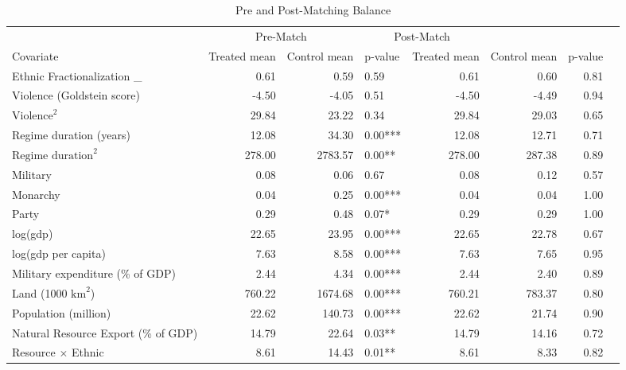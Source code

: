 \documentclass[12pt]{article}
\begin{document}
\begin{sidewaystable}[ht]
\centering
\begin{tabular}{lrrlrrrl}
  \hline
 & \multicolumn{2}{c}{Pre-Match} &   \multicolumn{2}{c}{Post-Match} \\
Covariate & Treated mean & Control mean & p-value & Treated mean & Control mean & p-value &  \\ 
  \hline
Ethnic Fractionalization \_ & 0.61 & 0.59 & 0.59 & 0.61 & 0.60 & 0.81 &  \\ 
Violence (Goldstein score) & -4.50 & -4.05 & 0.51 & -4.50 & -4.49 & 0.94 &  \\ 
$\text{Violence}^2$ & 29.84 & 23.22 & 0.34 & 29.84 & 29.03 & 0.65 &  \\ 
Regime duration (years) & 12.08 & 34.30 & 0.00*** & 12.08 & 12.71 & 0.71 &  \\ 
$\text{Regime duration}^2$ & 278.00 & 2783.57 & 0.00** & 278.00 & 287.38 & 0.89 &  \\ 
Military & 0.08 & 0.06 & 0.67 & 0.08 & 0.12 & 0.57 &  \\ 
Monarchy & 0.04 & 0.25 & 0.00*** & 0.04 & 0.04 & 1.00 &  \\ 
Party & 0.29 & 0.48 & 0.07* & 0.29 & 0.29 & 1.00 &  \\ 
log(gdp) & 22.65 & 23.95 & 0.00*** & 22.65 & 22.78 & 0.67 &  \\ 
log(gdp per capita) & 7.63 & 8.58 & 0.00*** & 7.63 & 7.65 & 0.95 &  \\ 
Military expenditure (\% of GDP) & 2.44 & 4.34 & 0.00*** & 2.44 & 2.40 & 0.89 &  \\
Land (1000 $\text{km}^2$)& 760.22 & 1674.68 & 0.00*** & 760.21 & 783.37 & 0.80 &  \\ 
Population (million) & 22.62 & 140.73 & 0.00*** & 22.62 & 21.74 & 0.90 &  \\
Natural Resource Export (\% of GDP) & 14.79 & 22.64 & 0.03** & 14.79 & 14.16 & 0.72 &  \\ 
Resource $\times$ Ethnic & 8.61 & 14.43 & 0.01** & 8.61 & 8.33 & 0.82 &  \\ 
   \hline
\end{tabular}
\caption{Pre and Post-Matching Balance}
\label{tab:matching_balance_largen}
\end{sidewaystable}
\end{document}
